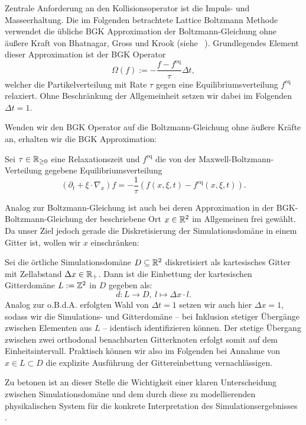Zentrale Anforderung an den Kollisionsoperator ist die Impuls- und Masseerhaltung. Die im Folgenden betrachtete Lattice Boltzmann Methode verwendet die übliche BGK Approximation der Boltzmann-Gleichung ohne äußere Kraft von Bhatnagar, Gross und Krook (siehe ~\cite[Kap.~3.5.3]{Krueger17}).
Grundlegendes Element dieser Approximation ist der BGK Operator
\[\Omega(f) := -\frac{f-f^\text{eq}}{\tau} \Delta t ,\]
welcher die Partikelverteilung mit Rate \(\tau\) gegen eine Equilibriumsverteilung \(f^\text{eq}\) relaxiert. Ohne Beschränkung der Allgemeinheit setzen wir dabei  im Folgenden \(\Delta t = 1\).

Wenden wir den BGK Operator auf die Boltzmann-Gleichung ohne äußere Kräfte an, erhalten wir die BGK Approximation:

\begin{Definition}
Sei \(\tau \in \mathbb{R}_{\geq 0}\) eine Relaxationszeit und \(f^\text{eq}\) die von der Maxwell-Boltzmann-Verteilung gegebene Equilibriumsverteilung
\[ (\partial_t + \xi \cdot \nabla_x) f = -\frac{1}{\tau} (f(x,\xi,t) - f^\text{eq}(x,\xi,t)) .\]
\end{Definition}

Analog zur Boltzmann-Gleichung ist auch bei deren Approximation in der BGK-Boltzmann-Gleichung der beschriebene Ort \(x \in \mathbb{R}^2\) im Allgemeinen frei gewählt. Da unser Ziel jedoch gerade die Diskretisierung der Simulationsdomäne in einem Gitter ist, wollen wir \(x\) einschränken:

\begin{Definition}[Ortsdiskretisierung]
\label{def:SpatialDiscretizationLBM}
Sei die örtliche Simulationsdomäne \(D \subseteq \mathbb{R}^2\) diskretisiert als kartesisches Gitter mit Zellabstand \(\Delta x \in \mathbb{R}_+\). Dann ist die Einbettung der kartesischen Gitterdomäne \(L := \mathbb{Z}^2\) in \(D\) gegeben als:
\[d : L \to D, \ l \mapsto \Delta x \cdot l.\]
Analog zur o.B.d.A. erfolgten Wahl von \(\Delta t = 1\) setzen wir auch hier \(\Delta x = 1\), sodass wir die Simulations- und Gitterdomäne -- bei Inklusion stetiger Übergänge zwischen Elementen aus \(L\) -- identisch identifizieren können. Der stetige Übergang zwischen zwei orthodonal benachbarten Gitterknoten erfolgt somit auf dem Einheitsintervall. Praktisch können wir also im Folgenden bei Annahme von \(x \in L \subset D\) die explizite Ausführung der Gittereinbettung vernachlässigen.
\end{Definition}

Zu betonen ist an dieser Stelle die Wichtigkeit einer klaren Unterscheidung zwischen Simulationsdomäne und dem durch diese zu modellierenden physikalischen System für die konkrete Interpretation des Simulationsergebnisses \cite[Kap.~7]{Krueger17}.

